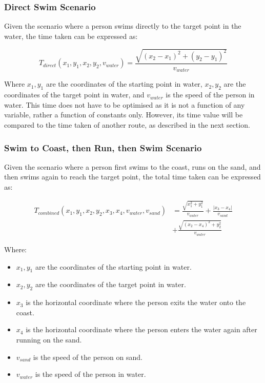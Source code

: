 \documentclass[11pt, a4paper]{article}
\begin{document}
\subsubsection{Direct Swim Scenario}

Given the scenario where a person swims directly to the target point in the water, the time taken can be expressed as:

\[ T_{direct}(x_1, y_1, x_2, y_2, v_{water}) = \frac{\sqrt{(x_2 - x_1)^2 + (y_2 - y_1)^2}}{v_{water}} \]

Where \( x_1, y_1 \) are the coordinates of the starting point in water, \( x_2, y_2 \)
are the coordinates of the target point in water, and \( v_{water} \) is the speed of the person in water.
This time does not have to be optimised as it is not a function of any variable, rather a function of constants only.
However, its time value will be compared to the time taken of another route, as described in the next section.

\subsubsection{Swim to Coast, then Run, then Swim Scenario}

Given the scenario where a person first swims to the coast, runs on the sand, and then swims again to reach the
target point, the total time taken can be expressed as:

\begin{align*}
T_{combined}(x_1, y_1, x_2, y_2, x_3, x_4, v_{water}, v_{sand}) &= \frac{\sqrt{x_1^2 + y_1^2}}{v_{water}} + \frac{|x_3 - x_4|}{v_{sand}} \\
&+ \frac{\sqrt{(x_2 - x_4)^2 + y_2^2}}{v_{water}}
\end{align*}

Where:
\begin{itemize}
    \item \( x_1, y_1 \) are the coordinates of the starting point in water.
    \item \( x_2, y_2 \) are the coordinates of the target point in water.
    \item \( x_3 \) is the horizontal coordinate where the person exits the water onto the coast.
    \item \( x_4 \) is the horizontal coordinate where the person enters the water again after running on the sand.
    \item \( v_{sand} \) is the speed of the person on sand.
    \item \( v_{water} \) is the speed of the person in water.
\end{itemize}
\end{document}
